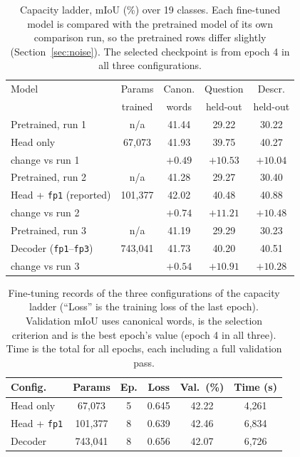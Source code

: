 \documentclass[conference]{IEEEtran}
\begin{document}
\begin{table}[t]
\caption{Capacity ladder, mIoU (\%) over 19 classes. Each fine-tuned model is compared with the pretrained model of its own comparison run, so the pretrained rows differ slightly (Section~\ref{sec:noise}). The selected checkpoint is from epoch 4 in all three configurations.}
\label{tab:ablation}
\centering
\small
\begin{tabular}{@{}lcccc@{}}
\toprule
Model & Params & Canon. & Question & Descr. \\
 & trained & words & held-out & held-out \\
\midrule
Pretrained, run 1       & n/a    & 41.44 & 29.22 & 30.22 \\
Head only               & 67,073 & 41.93 & 39.75 & 40.27 \\
\quad change vs run 1   &        & $+0.49$ & $+10.53$ & $+10.04$ \\
\midrule
Pretrained, run 2       & n/a    & 41.28 & 29.27 & 30.40 \\
Head + \texttt{fp1} (reported) & 101,377 & 42.02 & 40.48 & 40.88 \\
\quad change vs run 2   &        & $+0.74$ & $+11.21$ & $+10.48$ \\
\midrule
Pretrained, run 3       & n/a    & 41.19 & 29.29 & 30.23 \\
Decoder (\texttt{fp1}--\texttt{fp3}) & 743,041 & 41.73 & 40.20 & 40.51 \\
\quad change vs run 3   &        & $+0.54$ & $+10.91$ & $+10.28$ \\
\bottomrule
\end{tabular}
\end{table}

\begin{table}[t]
\caption{Fine-tuning records of the three configurations of the capacity ladder (``Loss'' is the training loss of the last epoch). Validation mIoU uses canonical words, is the selection criterion and is the best epoch's value (epoch 4 in all three). Time is the total for all epochs, each including a full validation pass.}
\label{tab:cap}
\centering
\small
\begin{tabular}{@{}lccccc@{}}
\toprule
Config. & Params & Ep. & Loss & Val.\ (\%) & Time (s) \\
\midrule
Head only          & 67,073  & 5 & 0.645 & 42.22 & 4,261 \\
Head + \texttt{fp1}  & 101,377 & 8 & 0.639 & 42.46 & 6,834 \\
Decoder            & 743,041 & 8 & 0.656 & 42.07 & 6,726 \\
\bottomrule
\end{tabular}
\end{table}
\end{document}
